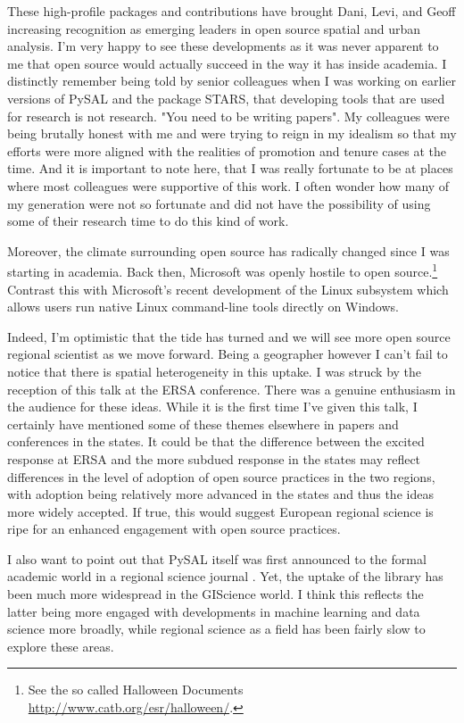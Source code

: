 \documentclass[11pt]{article}
\begin{document}
These high-profile packages and contributions have brought Dani, Levi, and
Geoff increasing recognition as emerging leaders in open source spatial and
urban analysis. I'm very happy to see these developments as it was never
apparent to me that open source would actually succeed in the way it has inside
academia. I distinctly remember being told by senior colleagues when I was
working on earlier versions of PySAL and the package STARS, that developing
tools that are used for research is not research. "You need to be writing
papers". My colleagues were being brutally honest with me and were trying to
reign in my idealism so that my efforts were more aligned with the realities of
promotion and tenure cases at the time. And it is important to note here, that
I was really fortunate to be at places where most colleagues were supportive of
this work. I often wonder how many of my generation were not so fortunate and
did not have the possibility of using some of their research time to do this
kind of work.

Moreover, the climate surrounding open source has radically changed since I was
starting in academia. Back then, Microsoft was openly hostile to open
source.\footnote{See the so called Halloween Documents \url{http://www.catb.org/esr/halloween/}.} Contrast this with Microsoft's recent development of the
Linux subsystem which allows users run native Linux command-line tools directly
on Windows.


Indeed, I'm optimistic that the tide has turned and we will see more open
source regional scientist as we move forward. Being a geographer however I
can't fail to notice that there is spatial heterogeneity in this uptake. I was
struck by the reception of this talk at the ERSA conference. There was a
genuine enthusiasm in the audience for these ideas. While it is the first time
I've given this talk, I certainly have mentioned some of these themes elsewhere
in papers \citep{Rey17_codeastext,rey_open_2014,Rey_2009} and conferences in the
states. It could be that the difference between the excited response at ERSA
and the more subdued response in the states may reflect differences in the
level of adoption of open source practices in the two regions, with adoption
being relatively more advanced in the states and thus the ideas more widely
accepted. If true, this would suggest European regional science is ripe for an
enhanced engagement with open source practices.

I also want to point out that PySAL itself was first announced to the formal
academic world in a regional science journal \citep{rey_pysal:_2007-3}. Yet,
the uptake of the library has been much more widespread in the GIScience world.
I think this reflects the latter being more engaged with developments in
machine learning and data science more broadly, while regional science as a
field has been fairly slow to explore these areas.
\end{document}

